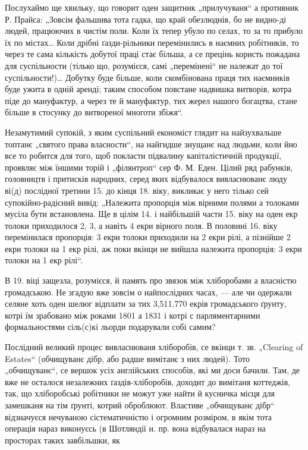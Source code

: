 Послухаймо ще хвильку, що говорит оден защитник „прилучуваня“ а противник Р. Прайса: „Зовсім
фальшива тота гадка, що край обезлюднів, бо не видно-ді людей, працюючих в чистім поли. Коли їх
тепер убуло по селах, то за то прибуло їх по містах\dots{} Коли дрібні ґазди-рільники перемінились в
наємних робітників, то через те сама кількість добутої праці стає більша, а се прецінь користь
пожадана для суспільности (тілько що, розумієся, самі „перемінені“ не належат до тої
суспільности!)\dots{} Добутку буде більше, коли скомбінована праця тих наємників буде ужита в одній
аренді; таким способом повстане надвишка витворів, котра піде до мануфактур, а через те й
мануфактур, тих жерел нашого богацтва, стане більше в стосунку до витвореної многоти збіжя“.

Незамутимий супокій, з яким суспільний економіст глядит на найзухвальше топтанє „святого права
власности“, на найгидше знущанє над людьми, коли йно все то робится для того, щоб покласти підвалину
капіталістичній продукції, проявляє між їншими торій і „філянтроп“ сер Ф. М. Еден. Цілий ряд
рабунків, головництв і притисків народних, серед яких відбувалося вивласнюванє люду ві(д) послідної
третини 15. до кінця 18. віку, викликає у него тілько сей супокійно-радісний вивід: „Належита
пропорція між вірними полями а толоками мусіла бути встановлена. Ще в цілім 14. і найбільшій части
15. віку на оден екр толоки приходилося 2, 3, а навіть 4 екри вірного поля. В половині 16. віку
перемінилася пропорція: 3 екри толоки приходили на 2 екри рілі, а пізнійше 2 екри толоки на 1 екр
рілі, аж поки вкінци не вийшла належита пропорція: 3 екри толоки на 1 екр рілі“.

В 19. віці защезла, розумієся, й память про звязок між хліборобами а власністю громадською. Не
згадую вже зовсім о найпослідних часах, — але чи одержали селяне хоть оден шелюг відплати за тих
3,511.770 екрів громадського ґрунту, котрі їм зрабовано між роками 1801 а 1831 і котрі с
парляментарними формальностями сіль(с)кі льорди подарували собі самим?

Послідний великий процес вивласнюваня хліборобів, се вкінци т. зв. „Clearing of Estates“ (обчищуванє
дібр, або радше вимітанє з них людей). Тото „обчищуванє“, се вершок усіх англійських способів, які
ми доси бачили. Там, де вже не осталося незалежних ґаздів-хліборобів, доходит до вимітаня коттеджів,
так, що хліборобські робітники не можут уже найти й кусничка місця для замешканя на тім ґрунті,
котрий оброблюют. Властиве „обчищуванє дібр“ відзначуєся нечуваною сістематичністю і огромним
розміром, в якім тота операція нараз виконуєсь (в Шотляндії н. пр.
вона відбувалася нараз на просторах таких завбільшки, як
\parbreak{}
